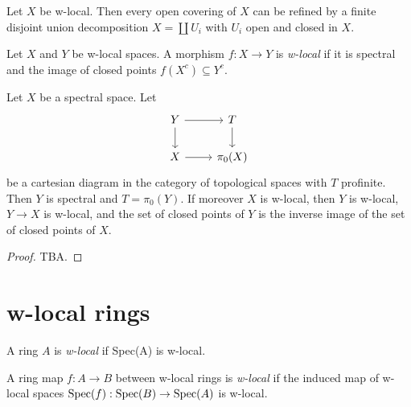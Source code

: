 \begin{lemma}
    Let $X$ be w-local. Then every open covering of $X$ can be refined
    by a finite disjoint union decomposition $X = \coprod U_i$ with $U_i$ open and closed in $X$.
\end{lemma}

\begin{definition}
    Let \(X\) and \(Y\) be w-local spaces. A morphism \(f: X \to Y\) is \emph{w-local} if it is spectral and the image of closed points \(f(X^c) \subseteq Y^c\).
    \label{def:w-local-space-map}
    \leanok
\end{definition}

\begin{lemma}
Let $X$ be a spectral space. Let
\[
\begin{tikzcd}
Y \arrow[r] \arrow[d] & T \arrow[d] \\
X \arrow[r] & \pi_0(X)
\end{tikzcd}
\]
be a cartesian diagram in the category of topological spaces with $T$ profinite. Then $Y$ is spectral and $T = \pi_0(Y)$. If moreover $X$ is w-local, then $Y$ is w-local, $Y \to X$ is w-local, and the set of closed points of $Y$ is the inverse image of the set of closed points of $X$.
\label{thm:cartesian-w-local}
\end{lemma}

\begin{proof}
  TBA.
\end{proof}

\section{w-local rings}

\begin{definition}
    A ring \(A\) is \emph{w-local} if Spec(A) is w-local.
    \label{def:w-local-ring}
    \leanok
\end{definition}

\begin{definition}
    A ring map \(f: A \to B\) between w-local rings is \emph{w-local} if the induced map of w-local spaces \(\operatorname{Spec}(f) : \operatorname{Spec}(B) \to \operatorname{Spec}(A)\) is w-local.
    \label{def:w-local-ring-map}
\end{definition}

